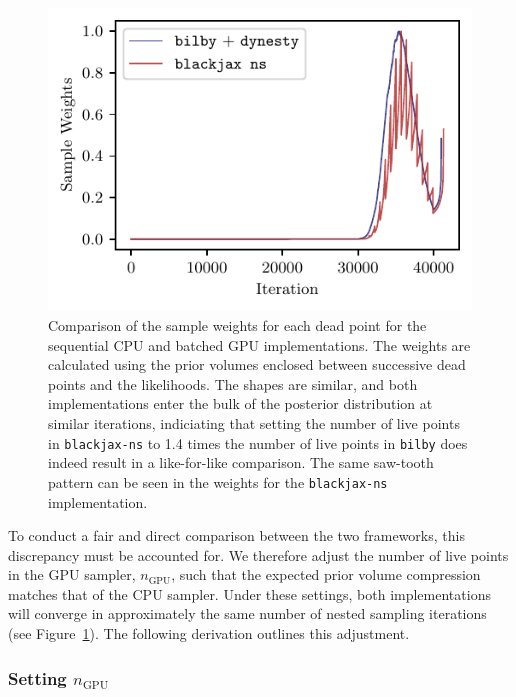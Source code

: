 \documentclass[fleqn,usenatbib]{mnras}
\begin{document}
\begin{figure}
    \centering
    \includegraphics{figures/weights_comparison.pdf}
    \caption{Comparison of the sample weights for each dead point for the sequential CPU and batched GPU implementations.
    The weights are calculated using the prior volumes enclosed between successive dead points and the likelihoods. 
    The shapes are similar, and both implementations enter the bulk of the posterior distribution at similar iterations,
    indiciating that setting the number of live points in \texttt{blackjax-ns} to 1.4 times the number of live points in \texttt{bilby} 
    does indeed result in a like-for-like comparison. The same saw-tooth pattern can be 
    seen in the weights for the \texttt{blackjax-ns} implementation.}
    \label{fig:weights_comparison}
\end{figure}

To conduct a fair and direct comparison between the two frameworks, this
discrepancy must be accounted for. We therefore adjust the number of
live points in the GPU sampler, $n_{\text{GPU}}$, such that the
expected prior volume compression matches that of the CPU sampler. 
Under these settings, both implementations will converge in
approximately the same number of nested sampling iterations (see Figure~\ref{fig:weights_comparison}). 
The following derivation outlines this adjustment.

\subsubsection{Setting $n_{\text{GPU}}$}
\label{sec:setting_n_gpu}
\end{document}
